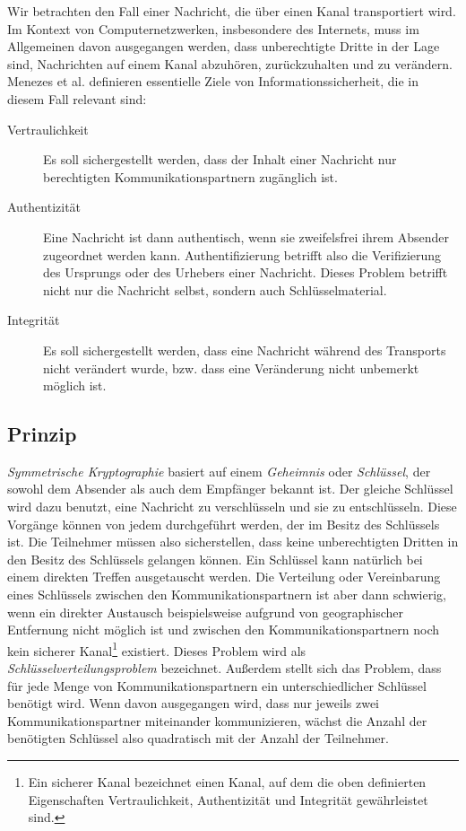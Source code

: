 Wir betrachten den Fall einer Nachricht, die über einen Kanal
transportiert wird. Im Kontext von Computernetzwerken, insbesondere
des Internets, muss im Allgemeinen davon ausgegangen werden, dass
unberechtigte Dritte in der Lage sind, Nachrichten auf einem Kanal
abzuhören, zurückzuhalten und zu verändern. \pagebreak[2] Menezes et
al. \cite{Menezes1996} definieren essentielle Ziele von
Informationssicherheit, die in diesem Fall relevant sind:
\begin{description}
\item[Vertraulichkeit] Es soll sichergestellt werden, dass der Inhalt
  einer Nachricht nur berechtigten Kommunikationspartnern zugänglich
  ist.
\item[Authentizität] Eine Nachricht ist dann authentisch, wenn sie
  zweifelsfrei ihrem Absender zugeordnet werden
  kann. Authentifizierung betrifft also die Verifizierung des
  Ursprungs oder des Urhebers einer Nachricht. Dieses Problem betrifft
  nicht nur die Nachricht selbst, sondern auch Schlüsselmaterial.
\item[Integrität] Es soll sichergestellt werden, dass eine Nachricht
  während des Transports nicht verändert wurde, bzw. dass eine
  Veränderung nicht unbemerkt möglich ist.
\end{description}

\subsection{Prinzip}
\label{ch:Grundlagen:sec:PublicKeyCrypto:subsec:Prinzip}

\emph{Symmetrische Kryptographie} basiert auf einem \emph{Geheimnis}
oder \emph{Schlüssel}, der sowohl dem Absender als auch dem
Empfänger bekannt ist. Der gleiche Schlüssel wird dazu benutzt,
eine Nachricht zu verschlüsseln und sie zu entschlüsseln. Diese
Vorgänge können von jedem durchgeführt werden, der im Besitz des
Schlüssels ist.  Die Teilnehmer müssen also sicherstellen, dass
keine unberechtigten Dritten in den Besitz des Schlüssels gelangen
können. Ein Schlüssel kann natürlich bei einem direkten Treffen
ausgetauscht werden. Die Verteilung oder Vereinbarung eines
Schlüssels zwischen den Kommunikationspartnern ist aber dann
schwierig, wenn ein direkter Austausch beispielsweise aufgrund von
geographischer Entfernung nicht möglich ist und zwischen den
Kommunikationspartnern noch kein sicherer Kanal\footnote{Ein sicherer
  Kanal bezeichnet einen Kanal, auf dem die oben definierten
  Eigenschaften Vertraulichkeit, Authentizität und Integrität
  gewährleistet sind.} existiert. Dieses Problem wird als
\emph{Schlüsselverteilungsproblem} bezeichnet\cite{Menezes1996}.
Außerdem stellt sich das Problem, dass für jede Menge von
Kommunikationspartnern ein unterschiedlicher Schlüssel benötigt
wird. Wenn davon ausgegangen wird, dass nur jeweils zwei
Kommunikationspartner miteinander kommunizieren, wächst die Anzahl
der benötigten Schlüssel also quadratisch mit der Anzahl der
Teilnehmer.

